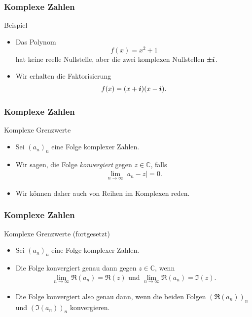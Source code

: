 \documentclass{beamer}
\def\vec#1{\mathchoice{\mbox{\boldmath$\displaystyle#1$}}
{\mbox{\boldmath$\textstyle#1$}}
{\mbox{\boldmath$\scriptstyle#1$}}
{\mbox{\boldmath$\scriptscriptstyle#1$}}}
\renewcommand{\emph}[1]{{\textcolor{solarizedRed}{\itshape #1}}}
\newcommand\ii{\vec i}
\newcommand\CC{\mathbb C}
\renewcommand{\oe}{\"o}
\newcommand{\mytitle}{Komplexe Zahlen}
\begin{document}
\begin{frame}\frametitle{\mytitle}
	\begin{block}{Beispiel}
		\begin{itemize}
			\item Das Polynom $$f(x)=x^2+1$$ hat keine reelle Nullstelle, aber die zwei komplexen Nullstellen $\pm\ii$.
			\item Wir erhalten die Faktorisierung
				\begin{align*}
					f(x)=(x+\ii)(x-\ii).
				\end{align*}
		\end{itemize}
	\end{block}
\end{frame}

\begin{frame}\frametitle{\mytitle}
	\begin{block}{Komplexe Grenzwerte}
		\begin{itemize}
			\item Sei $(a_n)_n$ eine Folge komplexer Zahlen.
			\item Wir sagen, die Folge \emph{konvergiert} gegen $z\in\CC$, falls
				\begin{align*}
					\lim_{n\to\infty}|a_n-z|=0.
				\end{align*}
			\item Wir k\oe nnen daher auch von Reihen im Komplexen reden.
		\end{itemize}
	\end{block}
\end{frame}

\begin{frame}\frametitle{\mytitle}
	\begin{block}{Komplexe Grenzwerte (fortgesetzt)}
		\begin{itemize}
			\item Sei $(a_n)_n$ eine Folge komplexer Zahlen.
			\item Die Folge konvergiert genau dann gegen $z\in\CC$, wenn
				\begin{align*}
					\lim_{n\to\infty}\Re(a_n)=\Re(z)\mbox{ und }\lim_{n\to\infty}\Re(a_n)=\Im(z).
				\end{align*}
			\item Die Folge konvergiert also genau dann, wenn die beiden Folgen $(\Re(a_n))_n$ und $(\Im(a_n))_n$ konvergieren.
		\end{itemize}
	\end{block}
\end{frame}
\end{document}

